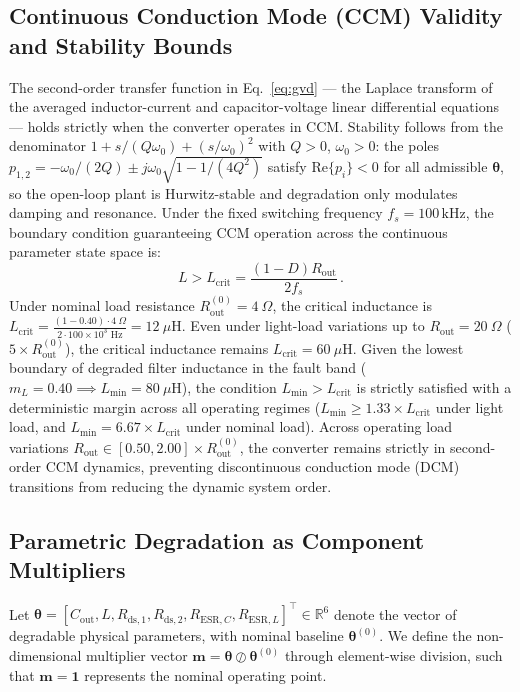 \documentclass[11pt,a4paper]{article}
\begin{document}
\subsection{Continuous Conduction Mode (CCM) Validity and Stability Bounds}
The second-order transfer function in Eq.~\eqref{eq:gvd} --- the Laplace transform of the averaged inductor-current and capacitor-voltage linear differential equations --- holds strictly when the converter operates in CCM. Stability follows from the denominator $1+s/(Q\omega_{0})+(s/\omega_{0})^{2}$ with $Q>0$, $\omega_{0}>0$: the poles $p_{1,2}=-\omega_{0}/(2Q)\pm j\omega_{0}\sqrt{1-1/(4Q^{2})}$ satisfy $\mathrm{Re}\{p_{i}\}<0$ for all admissible $\boldsymbol{\theta}$, so the open-loop plant is Hurwitz-stable and degradation only modulates damping and resonance. Under the fixed switching frequency $f_{s}=100\,\text{kHz}$, the boundary condition guaranteeing CCM operation across the continuous parameter state space is:
\begin{equation}
L > L_{\mathrm{crit}} = \frac{(1 - D) R_{\mathrm{out}}}{2 f_s}\,.
\label{eq:ccm-bound}
\end{equation}
Under nominal load resistance $R_{\mathrm{out}}^{(0)} = 4\ \Omega$, the critical inductance is $L_{\mathrm{crit}} = \frac{(1 - 0.40) \cdot 4\ \Omega}{2 \cdot 100\times 10^3\text{ Hz}} = 12\ \mu\text{H}$. Even under light-load variations up to $R_{\mathrm{out}} = 20\ \Omega$ ($5\times R_{\mathrm{out}}^{(0)}$), the critical inductance remains $L_{\mathrm{crit}} = 60\ \mu\text{H}$. Given the lowest boundary of degraded filter inductance in the fault band ($m_L = 0.40 \implies L_{\mathrm{min}} = 80\ \mu\text{H}$), the condition $L_{\mathrm{min}} > L_{\mathrm{crit}}$ is strictly satisfied with a deterministic margin across all operating regimes ($L_{\mathrm{min}} \ge 1.33 \times L_{\mathrm{crit}}$ under light load, and $L_{\mathrm{min}} = 6.67 \times L_{\mathrm{crit}}$ under nominal load). Across operating load variations $R_{\mathrm{out}} \in [0.50, 2.00]\times R_{\mathrm{out}}^{(0)}$, the converter remains strictly in second-order CCM dynamics, preventing discontinuous conduction mode (DCM) transitions from reducing the dynamic system order.

\subsection{Parametric Degradation as Component Multipliers}
Let $\boldsymbol{\theta} = [C_{\mathrm{out}}, L, R_{\mathrm{ds},1}, R_{\mathrm{ds},2}, R_{\mathrm{ESR},C}, R_{\mathrm{ESR},L}]^\top \in \mathbb{R}^6$ denote the vector of degradable physical parameters, with nominal baseline $\boldsymbol{\theta}^{(0)}$. We define the non-dimensional multiplier vector $\mathbf{m} = \boldsymbol{\theta} \oslash \boldsymbol{\theta}^{(0)}$ through element-wise division, such that $\mathbf{m} = \mathbf{1}$ represents the nominal operating point. 
\end{document}
